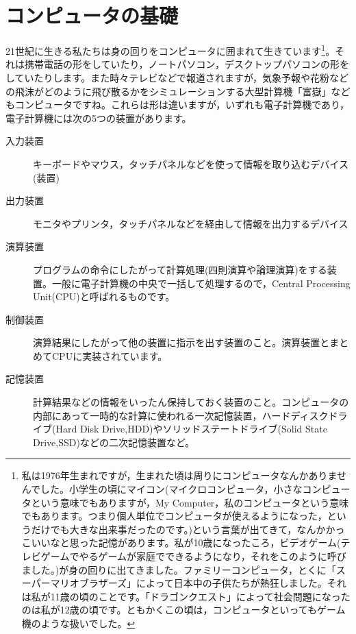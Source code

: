 \documentclass{ltjsbook}
\begin{document}
\section{コンピュータの基礎}
21世紀に生きる私たちは身の回りをコンピュータに囲まれて生きています\footnote{私は1976年生まれですが，生まれた頃は周りにコンピュータなんかありませんでした。小学生の頃にマイコン(マイクロコンピュータ，小さなコンピュータという意味でもありますが，My Computer，私のコンピュータという意味でもあります。つまり個人単位でコンピュータが使えるようになった，というだけでも大きな出来事だったのです。)という言葉が出てきて，なんかかっこいいなと思った記憶があります。私が10歳になったころ，ビデオゲーム(テレビゲームでやるゲームが家庭でできるようになり，それをこのように呼びました。)が身の回りに出てきました。ファミリーコンピュータ，とくに「スーパーマリオブラザーズ」によって日本中の子供たちが熱狂しました。それは私が11歳の頃のことです。「ドラゴンクエスト」によって社会問題になったのは私が12歳の頃です。ともかくこの頃は，コンピュータといってもゲーム機のような扱いでした。}。それは携帯電話の形をしていたり，ノートパソコン，デスクトップパソコンの形をしていたりします。また時々テレビなどで報道されますが，気象予報や花粉などの飛沫がどのように飛び散るかをシミュレーションする大型計算機「富嶽」などもコンピュータですね。これらは形は違いますが，いずれも電子計算機であり，電子計算機には次の5つの装置があります。
\begin{description}
	\item[入力装置] キーボードやマウス，タッチパネルなどを使って情報を取り込むデバイス(装置)
	\item[出力装置] モニタやプリンタ，タッチパネルなどを経由して情報を出力するデバイス
	\item[演算装置] プログラムの命令にしたがって計算処理(四則演算や論理演算)をする装置。一般に電子計算機の中央で一括して処理するので，Central Processing Unit(CPU)と呼ばれるものです。
	\item[制御装置] 演算結果にしたがって他の装置に指示を出す装置のこと。演算装置とまとめてCPUに実装されています。
	\item[記憶装置] 計算結果などの情報をいったん保持しておく装置のこと。コンピュータの内部にあって一時的な計算に使われる一次記憶装置，ハードディスクドライブ(Hard Disk Drive,HDD)やソリッドステートドライブ(Solid State Drive,SSD)などの二次記憶装置など。
\end{description}
\end{document}
